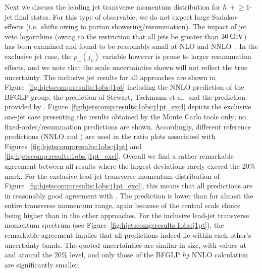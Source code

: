 Next we discuss the leading jet transverse momentum distribution for
$h\,+\!\ge\!1$-jet final states. For this type of observable, we do
not expect large Sudakov effects (i.e.~shifts owing to parton
showering/resummation). The impact of jet veto logarithms (owing to
the restriction that all jets be greater than $30\text{\:GeV}$) has been
examined and found to be reasonably small at NLO and
NNLO~\cite{Banfi:2012jm,Banfi:2015pju}.
In the exclusive jet case, the $p_\perp(j_1)$ variable however is
prone to larger resummation effects, and we note that the scale
uncertainties shown will not reflect the true uncertainty. The
inclusive jet results for all approaches are shown in
Figure~\ref{fig:hjetscomp:results:1obs:j1pt} including the NNLO
prediction of the BFGLP group, the prediction of Stewart, Tackmann
et al.~and the prediction provided by \Resbos.
Figure~\ref{fig:hjetscomp:results:1obs:j1pt_excl} depicts the
exclusive one-jet case presenting the results obtained by the Monte
Carlo tools only; no fixed-order/resummation predictions are shown.
Accordingly, different reference predictions (NNLO and \Powheg) are
used in the ratio plots associated with
Figures~\ref{fig:hjetscomp:results:1obs:j1pt} and
\ref{fig:hjetscomp:results:1obs:j1pt_excl}. 
Overall we find a rather remarkable agreement
between all results where the largest deviations rarely exceed the
20\% mark. For the exclusive lead-jet transverse momentum distribution
of Figure~\ref{fig:hjetscomp:results:1obs:j1pt_excl}, this means that
all predictions are in reasonably good agreement with \Powheg. The
\MGaMC prediction is lower than \Powheg for almost the entire
transverse momentum range, again because of the central scale choice
being higher than in the other approaches. For the inclusive lead-jet
transverse momentum spectrum (see
Figure~\ref{fig:hjetscomp:results:1obs:j1pt}), the remarkable
agreement implies that all predictions indeed lie within each other's
uncertainty bands. The quoted uncertainties are similar in size, with
values at and around the 20\% level, and only those of the BFGLP $hj$
NNLO calculation are significantly smaller. 

